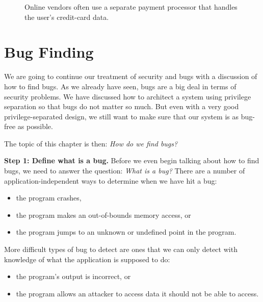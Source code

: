 \documentclass[
  letterpaper,
]{scrbook}
\providecommand{\tightlist}{%
  \setlength{\itemsep}{0pt}\setlength{\parskip}{0pt}}
\theoremstyle{definition}
\theoremstyle{plain}
\theoremstyle{plain}
\theoremstyle{remark}
\begin{document}
\begin{figure}


\caption{\label{fig-payment}Online vendors often use a separate payment
processor that handles the user's credit-card data.}

\end{figure}%

\chapter{Bug Finding}\label{bug-finding}

We are going to continue our treatment of security and bugs with a
discussion of how to find bugs. As we already have seen, bugs are a big
deal in terms of security problems. We have discussed how to architect a
system using privilege separation so that bugs do not matter so much.
But even with a very good privilege-separated design, we still want to
make sure that our system is as bug-free as possible.

The topic of this chapter is then: \emph{How do we find bugs?}

\textbf{Step 1: Define what is a bug.} Before we even begin talking
about how to find bugs, we need to answer the question: \emph{What is a
bug?} There are a number of application-independent ways to determine
when we have hit a bug:

\begin{itemize}
\tightlist
\item
  the program crashes,
\item
  the program makes an out-of-bounds memory access, or
\item
  the program jumps to an unknown or undefined point in the program.
\end{itemize}

More difficult types of bug to detect are ones that we can only detect
with knowledge of what the application is supposed to do:

\begin{itemize}
\tightlist
\item
  the program's output is incorrect, or
\item
  the program allows an attacker to access data it should not be able to
  access.
\end{itemize}
\end{document}
